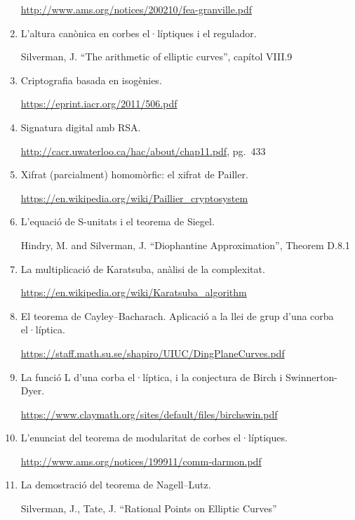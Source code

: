 \begin{enumerate}
{\tiny \url{http://www.ams.org/notices/200210/fea-granville.pdf}}

\item L'altura canònica en corbes el·líptiques i el regulador.

{\tiny Silverman, J. ``The arithmetic of elliptic curves'',  capítol VIII.9}

\item Criptografia basada en isogènies.

{\tiny \url{https://eprint.iacr.org/2011/506.pdf}}

\item Signatura digital amb RSA.

{\tiny \url{http://cacr.uwaterloo.ca/hac/about/chap11.pdf}, pg.~433}


\item Xifrat (parcialment) homomòrfic: el xifrat de Pailler.

{\tiny \url{https://en.wikipedia.org/wiki/Paillier_cryptosystem}}

\item L'equació de S-unitats i el teorema de Siegel.

{\tiny Hindry, M. and Silverman, J. ``Diophantine Approximation'',  Theorem D.8.1}

\item La multiplicació de Karatsuba, anàlisi de la complexitat.

{\tiny \url{https://en.wikipedia.org/wiki/Karatsuba_algorithm}
}

\item El teorema de Cayley--Bacharach. Aplicació a la llei de grup d'una corba el·líptica.

{\tiny \url{https://staff.math.su.se/shapiro/UIUC/DingPlaneCurves.pdf}
}

\item La funció L d'una corba el·líptica, i la conjectura de Birch i Swinnerton-Dyer.

{\tiny \url{https://www.claymath.org/sites/default/files/birchswin.pdf}
}

\item L'enunciat del teorema de modularitat de corbes el·líptiques.

{\tiny \url{http://www.ams.org/notices/199911/comm-darmon.pdf}}

\item La demostració del teorema de Nagell--Lutz.

{\tiny Silverman, J., Tate, J. ``Rational Points on Elliptic Curves''}


\end{enumerate}
